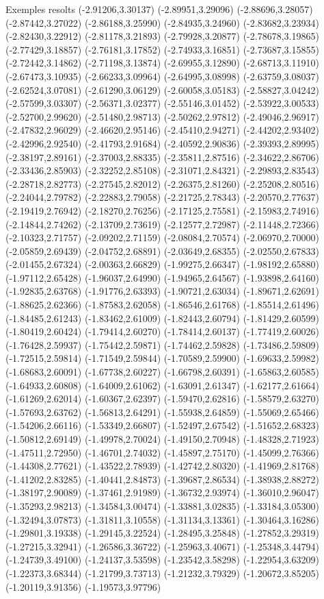 \documentclass[11pt,a4paper]{article}
\begin{document}
\begin{fmex}{Exemples resolts}
(-2.91206,3.30137) (-2.89951,3.29096) (-2.88696,3.28057) (-2.87442,3.27022) (-2.86188,3.25990) (-2.84935,3.24960) (-2.83682,3.23934) (-2.82430,3.22912) (-2.81178,3.21893) (-2.79928,3.20877) (-2.78678,3.19865) (-2.77429,3.18857) (-2.76181,3.17852) (-2.74933,3.16851) (-2.73687,3.15855) (-2.72442,3.14862) (-2.71198,3.13874) (-2.69955,3.12890) (-2.68713,3.11910) (-2.67473,3.10935) (-2.66233,3.09964) (-2.64995,3.08998) (-2.63759,3.08037) (-2.62524,3.07081) (-2.61290,3.06129) (-2.60058,3.05183) (-2.58827,3.04242) (-2.57599,3.03307) (-2.56371,3.02377) (-2.55146,3.01452) (-2.53922,3.00533) (-2.52700,2.99620) (-2.51480,2.98713) (-2.50262,2.97812) (-2.49046,2.96917) (-2.47832,2.96029) (-2.46620,2.95146) (-2.45410,2.94271) (-2.44202,2.93402) (-2.42996,2.92540) (-2.41793,2.91684) (-2.40592,2.90836) (-2.39393,2.89995) (-2.38197,2.89161) (-2.37003,2.88335) (-2.35811,2.87516) (-2.34622,2.86706) (-2.33436,2.85903) (-2.32252,2.85108) (-2.31071,2.84321) (-2.29893,2.83543) (-2.28718,2.82773) (-2.27545,2.82012) (-2.26375,2.81260) (-2.25208,2.80516) (-2.24044,2.79782) (-2.22883,2.79058) (-2.21725,2.78343) (-2.20570,2.77637) (-2.19419,2.76942) (-2.18270,2.76256) (-2.17125,2.75581) (-2.15983,2.74916) (-2.14844,2.74262) (-2.13709,2.73619) (-2.12577,2.72987) (-2.11448,2.72366) (-2.10323,2.71757) (-2.09202,2.71159) (-2.08084,2.70574) (-2.06970,2.70000) (-2.05859,2.69439) (-2.04752,2.68891) (-2.03649,2.68355) (-2.02550,2.67833) (-2.01455,2.67324) (-2.00363,2.66829) (-1.99275,2.66347) (-1.98192,2.65880) (-1.97112,2.65428) (-1.96037,2.64990) (-1.94965,2.64567) (-1.93898,2.64160) (-1.92835,2.63768) (-1.91776,2.63393) (-1.90721,2.63034) (-1.89671,2.62691) (-1.88625,2.62366) (-1.87583,2.62058) (-1.86546,2.61768) (-1.85514,2.61496) (-1.84485,2.61243) (-1.83462,2.61009) (-1.82443,2.60794) (-1.81429,2.60599) (-1.80419,2.60424) (-1.79414,2.60270) (-1.78414,2.60137) (-1.77419,2.60026) (-1.76428,2.59937) (-1.75442,2.59871) (-1.74462,2.59828) (-1.73486,2.59809) (-1.72515,2.59814) (-1.71549,2.59844) (-1.70589,2.59900) (-1.69633,2.59982) (-1.68683,2.60091) (-1.67738,2.60227) (-1.66798,2.60391) (-1.65863,2.60585) (-1.64933,2.60808) (-1.64009,2.61062) (-1.63091,2.61347) (-1.62177,2.61664) (-1.61269,2.62014) (-1.60367,2.62397) (-1.59470,2.62816) (-1.58579,2.63270) (-1.57693,2.63762) (-1.56813,2.64291) (-1.55938,2.64859) (-1.55069,2.65466) (-1.54206,2.66116) (-1.53349,2.66807) (-1.52497,2.67542) (-1.51652,2.68323) (-1.50812,2.69149) (-1.49978,2.70024) (-1.49150,2.70948) (-1.48328,2.71923) (-1.47511,2.72950) (-1.46701,2.74032) (-1.45897,2.75170) (-1.45099,2.76366) (-1.44308,2.77621) (-1.43522,2.78939) (-1.42742,2.80320) (-1.41969,2.81768) (-1.41202,2.83285) (-1.40441,2.84873) (-1.39687,2.86534) (-1.38938,2.88272) (-1.38197,2.90089) (-1.37461,2.91989) (-1.36732,2.93974) (-1.36010,2.96047) (-1.35293,2.98213) (-1.34584,3.00474) (-1.33881,3.02835) (-1.33184,3.05300) (-1.32494,3.07873) (-1.31811,3.10558) (-1.31134,3.13361) (-1.30464,3.16286) (-1.29801,3.19338) (-1.29145,3.22524) (-1.28495,3.25848) (-1.27852,3.29319) (-1.27215,3.32941) (-1.26586,3.36722) (-1.25963,3.40671) (-1.25348,3.44794) (-1.24739,3.49100) (-1.24137,3.53598) (-1.23542,3.58298) (-1.22954,3.63209) (-1.22373,3.68344) (-1.21799,3.73713) (-1.21232,3.79329) (-1.20672,3.85205) (-1.20119,3.91356) (-1.19573,3.97796) 
\end{fmex}
\end{document}
